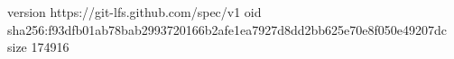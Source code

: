 version https://git-lfs.github.com/spec/v1
oid sha256:f93dfb01ab78bab2993720166b2afe1ea7927d8dd2bb625e70e8f050e49207dc
size 174916
